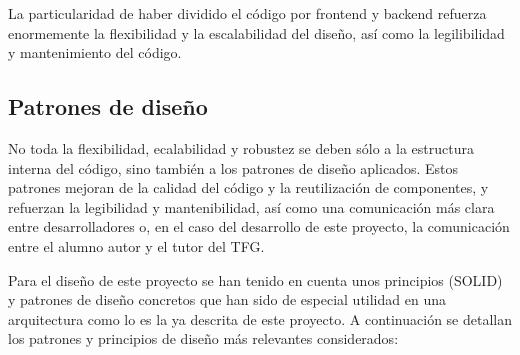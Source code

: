 La particularidad de haber dividido el código por frontend y backend refuerza enormemente la flexibilidad y la escalabilidad del diseño, así como la legilibilidad y mantenimiento del código.

\subsection{Patrones de diseño}

No toda la flexibilidad, ecalabilidad y robustez se deben sólo a la estructura interna del código, sino también a los patrones de diseño aplicados. Estos patrones mejoran de la calidad del código y la reutilización de componentes, y refuerzan la legibilidad y mantenibilidad, así como una comunicación más clara entre desarrolladores o, en el caso del desarrollo de este proyecto, la comunicación entre el alumno autor y el tutor del TFG. 

Para el diseño de este proyecto se han tenido en cuenta unos principios (SOLID) y patrones de diseño concretos que han sido de especial utilidad en una arquitectura como lo es la ya descrita de este proyecto. A continuación se detallan los patrones y principios de diseño más relevantes considerados:

